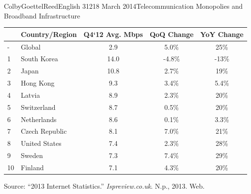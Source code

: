 \documentclass[12pt]{article}
\begin{document}
\begin{mla}{Colby}{Goettel}{Reed}{English 312}{18 March 2014}{Telecommunication Monopolies and Broadband Infrastructure}
\begin{minipage}{\linewidth}
    \label{table:connection-speed}
    \begin{tabular}{llccc}
        \toprule
        ~  & Country/Region & Q4`12 Avg. Mbps & QoQ Change & YoY Change \\
        \midrule
        -  & Global         & 2.9  & 5.0\%  & 25\% \\
        1  & South Korea    & 14.0 & -4.8\% & -13\% \\
        2  & Japan          & 10.8 & 2.7\%  & 19\% \\
        3  & Hong Kong      & 9.3  & 3.4\%  & 5.4\% \\
        4  & Latvia         & 8.9  & 2.3\%  & 20\% \\
        5  & Switzerland    & 8.7  & 0.5\%  & 20\% \\
        6  & Netherlands    & 8.6  & 0.1\%  & 3.3\% \\
        7  & Czech Republic & 8.1  & 7.0\%  & 21\% \\
        8  & United States  & 7.4  & 2.3\%  & 28\% \\
        9  & Sweden         & 7.3  & 7.4\%  & 29\% \\
        10 & Finland        & 7.1  & 4.3\%  & 20\% \\
        \bottomrule
    \end{tabular}\par
    \bigskip
    Source: ``2013 Internet Statistics.'' \textit{Ispreview.co.uk}. N.p., 2013. Web.\bigskip
\end{minipage}


\end{mla}
\end{document}
